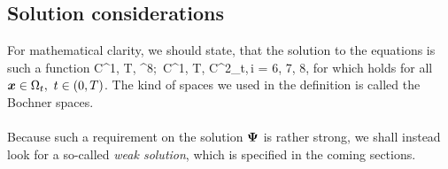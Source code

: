 \subsection{Solution considerations}
For mathematical clarity, we should state, that the solution to the equations  is such a function
\be
\label{HardSln} \mrPsi\in C^1\lo{}, T\ro, ^8\ro;\ \mrPsii\in C^1\lo{}, T\ro, C^2\lo\Omega_{t}\ro\ro,\,i = 6, 7, 8,
\ee
for which  holds for all $\mbox{\boldmath $x$}\in\Omega_t,\ t\in\left( 0, T\right)$. The kind of spaces we used in the definition is called the Bochner spaces.
\paragraph{}
Because such a requirement on the solution $\mathrm{\mathbf{\Psi}}$ is rather strong, we shall instead look for a so-called \textit{weak solution}, which is specified in the coming sections.